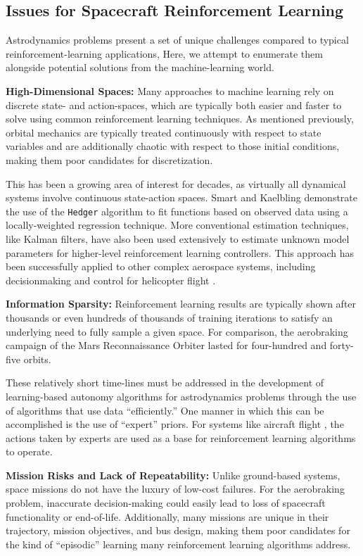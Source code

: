 \documentclass[paper,11pt]{AAS}		%
\begin{document}
\subsection{Issues for Spacecraft Reinforcement Learning}

Astrodynamics problems present a set of unique challenges compared to typical reinforcement-learning applications, Here, we attempt to enumerate them alongside potential solutions from the machine-learning world.

\textbf{High-Dimensional Spaces:} Many approaches to machine learning rely on discrete state- and action-spaces, which are typically both easier and faster to solve using common reinforcement learning techniques. As mentioned previously, orbital mechanics are typically treated continuously with respect to state variables and are additionally chaotic with respect to those initial conditions, making them poor candidates for discretization. 

This has been a growing area of interest for decades, as virtually all dynamical systems involve continuous state-action spaces. Smart and Kaelbling \cite{Smart2000} demonstrate the use of the \verb|Hedger| algorithm to fit functions based on observed data using a locally-weighted regression technique. More conventional estimation techniques, like Kalman filters, have also been used extensively to estimate unknown model parameters for higher-level reinforcement learning controllers. This approach has been successfully applied to other complex aerospace systems, including decisionmaking and control for helicopter flight \cite{Abbeel2007}.

\textbf{Information Sparsity:} Reinforcement learning results are typically shown after thousands or even hundreds of thousands of training iterations to satisfy an underlying need to fully sample a given space. For comparison, the aerobraking campaign of the Mars Reconnaissance Orbiter lasted for four-hundred and forty-five orbits. 

These relatively short time-lines must be addressed in the development of learning-based autonomy algorithms for astrodynamics problems through the use of algorithms that use data ``efficiently.'' One manner in which this can be accomplished is the use of ``expert'' priors. For systems like aircraft flight \cite{Abbeel2007}, the actions taken by experts are used as a base for reinforcement learning algorithms to operate.

\textbf{Mission Risks and Lack of Repeatability:} Unlike ground-based systems, space missions do not have the luxury of low-cost failures. For the aerobraking problem, inaccurate decision-making could easily lead to loss of spacecraft functionality or end-of-life. Additionally, many missions are unique in their trajectory, mission objectives, and bus design, making them poor candidates for the kind of ``episodic'' learning many reinforcement learning algorithms address. 
\end{document}
